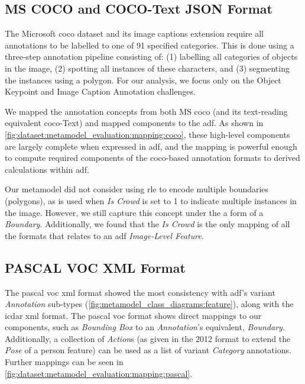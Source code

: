 \subsection{MS COCO and COCO-Text JSON Format}

The Microsoft \gls{coco} \citep{Lin:2014vma} dataset and its image captions extension \citep{Chen:2015ur} require all annotations to be labelled to one of 91 specified categories. This is done using a three-step annotation pipeline consisting of: (1) labelling all categories of objects in the image, (2) spotting all instances of these characters, and (3) segmenting the instances using a polygon. For our analysis, we focus only on the Object Keypoint and Image Caption Annotation challenges.

We mapped the annotation concepts from both MS \gls{coco} (and its text-reading equivalent \gls{coco}-Text) and mapped components to the \gls{adf}. As shown in \cref{fig:dataset:metamodel_evaluation:mapping:coco}, these high-level components are largely complete when expressed in \gls{adf}, and the mapping is powerful enough to compute required components of the \gls{coco}-based annotation formats to derived calculations within \gls{adf}.

Our metamodel did not consider using \gls{rle} to encode multiple boundaries (polygons), as is used when \textit{Is Crowd} is set to 1 to indicate multiple instances in the image. However, we still capture this concept under the a form of a \textit{Boundary}. Additionally, we found that the \textit{Is Crowd} is the only mapping of all the formats that relates to an \gls{adf} \textit{Image-Level Feature}.

\subsection{PASCAL VOC XML Format}

The \gls{pascal} \gls{voc} \gls{xml} format showed the most consistency with \gls{adf}'s variant \textit{Annotation} sub-types (\cref{fig:metamodel_class_diagrams:feature}), along with the \gls{icdar} \gls{xml} format. The \gls{pascal} \gls{voc} format shows direct mappings to our components, such as \textit{Bounding Box} to an \textit{Annotation}'s equivalent, \textit{Boundary}. Additionally, a collection of \textit{Action}s (as given in the 2012 format to extend the \textit{Pose} of a person feature) can be used as a list of variant \textit{Category} annotations. Further mappings can be seen in \cref{fig:dataset:metamodel_evaluation:mapping:pascal}.

